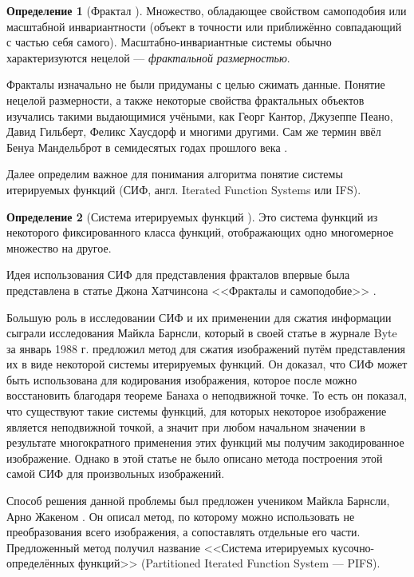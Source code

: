 \documentclass[bachelor,paper]{pmk-graduate}
\theoremstyle{definition}
\newtheorem{dfn}{Определение}
\begin{document}
\begin{dfn}[Фрактал \cite{fractalDef}]
  Множество, обладающее свойством самоподобия или масштабной инвариантности (объект в точности или приближённо совпадающий с частью себя самого). Масштабно-инвариантные системы обычно характеризуются нецелой --- {\em фрактальной размерностью}.
\end{dfn}

Фракталы изначально не были придуманы с целью сжимать данные. Понятие нецелой размерности, а также некоторые свойства фрактальных объектов изучались такими выдающимися учёными, как Георг Кантор, Джузеппе Пеано, Давид Гильберт, Феликс Хаусдорф и многими другими. Сам же термин ввёл Бенуа Мандельброт в семидесятых годах прошлого века \cite{fractalDef, mandelbrot}.

Далее определим важное для понимания алгоритма понятие системы итерируемых функций (СИФ, англ. Iterated Function Systems или IFS).
\begin{dfn}[Система итерируемых функций \cite{fractalDef}]
  Это система функций из некоторого фиксированного класса функций, отображающих одно многомерное множество на другое.
\end{dfn}

Идея использования СИФ для представления фракталов впервые была представлена в статье Джона Хатчинсона <<Фракталы и самоподобие>> \cite{hutchinson}.%


Большую роль в исследовании СИФ и их применении для сжатия информации сыграли исследования Майкла Барнсли, который в своей статье в журнале Byte за январь 1988 г. \cite{barnsleyByte} предложил метод для сжатия изображений путём представления их в виде некоторой системы итерируемых функций. Он доказал, что СИФ может быть использована для кодирования изображения, которое после можно восстановить благодаря теореме Банаха о неподвижной точке. То есть он показал, что существуют такие системы функций, для которых некоторое изображение является неподвижной точкой, а значит при любом начальном значении в результате многократного применения этих функций мы получим закодированное изображение. Однако в этой статье не было описано метода построения этой самой СИФ для произвольных изображений.

Способ решения данной проблемы был предложен учеником Майкла Барнсли, Арно Жакеном \cite{jacquin}. Он описал метод, по которому можно использовать не преобразования всего изображения, а сопоставлять отдельные его части. Предложенный метод получил название <<Сис\-те\-ма итерируемых ку\-соч\-но-оп\-ре\-де\-лён\-ных функ\-ций>> (Partitioned Iterated Function System --- PIFS).
\end{document}
